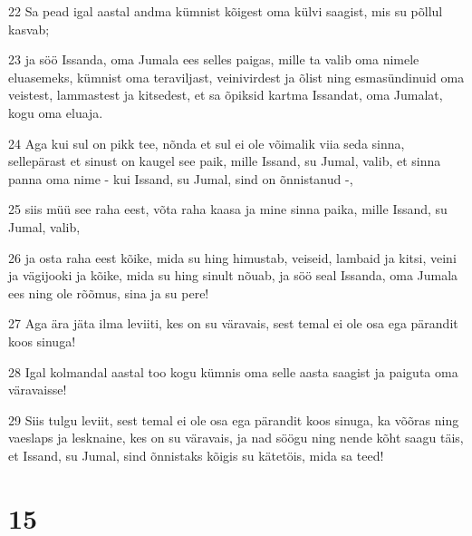 \par 22 Sa pead igal aastal andma kümnist kõigest oma külvi saagist, mis su põllul kasvab;
\par 23 ja söö Issanda, oma Jumala ees selles paigas, mille ta valib oma nimele eluasemeks, kümnist oma teraviljast, veinivirdest ja õlist ning esmasündinuid oma veistest, lammastest ja kitsedest, et sa õpiksid kartma Issandat, oma Jumalat, kogu oma eluaja.
\par 24 Aga kui sul on pikk tee, nõnda et sul ei ole võimalik viia seda sinna, sellepärast et sinust on kaugel see paik, mille Issand, su Jumal, valib, et sinna panna oma nime - kui Issand, su Jumal, sind on õnnistanud -,
\par 25 siis müü see raha eest, võta raha kaasa ja mine sinna paika, mille Issand, su Jumal, valib,
\par 26 ja osta raha eest kõike, mida su hing himustab, veiseid, lambaid ja kitsi, veini ja vägijooki ja kõike, mida su hing sinult nõuab, ja söö seal Issanda, oma Jumala ees ning ole rõõmus, sina ja su pere!
\par 27 Aga ära jäta ilma leviiti, kes on su väravais, sest temal ei ole osa ega pärandit koos sinuga!
\par 28 Igal kolmandal aastal too kogu kümnis oma selle aasta saagist ja paiguta oma väravaisse!
\par 29 Siis tulgu leviit, sest temal ei ole osa ega pärandit koos sinuga, ka võõras ning vaeslaps ja lesknaine, kes on su väravais, ja nad söögu ning nende kõht saagu täis, et Issand, su Jumal, sind õnnistaks kõigis su kätetöis, mida sa teed!

\chapter{15}

